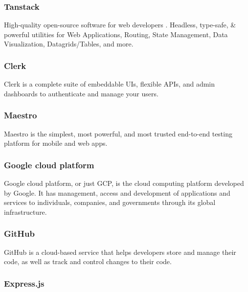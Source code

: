 \subsubsection*{\protect{} Tanstack}
                                                                      
High-quality open-source software for web developers \cite{TanstackWebsite}. Headless, type-safe, \& powerful utilities for Web Applications, Routing, State Management, Data Visualization, Datagrids/Tables, and more.

\subsubsection*{\protect{} Clerk}
                                                                        
Clerk \cite{ClerkAuthenticationDocs} is a complete suite of embeddable UIs, flexible APIs, and admin dashboards to authenticate and manage your users.

\subsubsection*{\protect{} Maestro}
                                                                        
Maestro \cite{MaestroDocs2022} is the simplest, most powerful, and most trusted end-to-end testing platform for mobile and web apps.

\subsubsection*{\protect{} Google cloud platform}

Google cloud platform, or just GCP, is the cloud computing platform developed by Google. It has management, access and development of applications and services to individuals, companies, and governments through its global infrastructure.

\subsubsection*{\protect{} GitHub}

GitHub \cite{GithubWebsite} is a cloud-based service that helps developers store and manage their code, as well as track and control changes to their code.

\subsubsection*{\protect{} Express.js}

